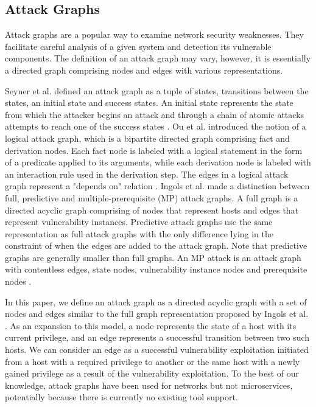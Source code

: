 \subsection{Attack Graphs}
\label{chap:attack_graphs}

Attack graphs \cite{sheyner2002automated} are a popular way to examine network security weaknesses. They facilitate careful analysis of a given system and detection its vulnerable components. The definition of an attack graph may vary, however, it is essentially a directed graph comprising nodes and edges with various representations.

Seyner et al. defined an attack graph as a tuple of states, transitions between the states, an initial state and success states. An initial state represents the state from which the attacker begins an attack and through a chain of atomic attacks attempts to reach one of the success states \cite{sheyner2002automated}. Ou et al. introduced the notion of a logical attack graph, which is a bipartite directed graph comprising fact and derivation nodes. Each fact node is labeled with a logical statement in the form of a predicate applied to its arguments, while each derivation node is labeled with an interaction rule used in the derivation step. The edges in a logical attack graph represent a "depends on" relation \cite{ou2006scalable}. Ingols et al. made a distinction between full, predictive and multiple-prerequisite (MP) attack graphs. A full graph is a directed acyclic graph comprising of nodes that represent hosts and edges that represent vulnerability instances. Predictive attack graphs use the same representation as full attack graphs with the only difference lying in the constraint of when the edges are added to the attack graph. Note that predictive graphs are generally smaller than full graphs. An MP attack is an attack graph with contentless edges, state nodes, vulnerability instance nodes and prerequisite nodes \cite{ingols2006practical}.

In this paper, we define an attack graph as a directed acyclic graph with a set of nodes and edges similar to the full graph representation proposed by Ingols et al. \cite{ingols2006practical}. As an expansion to this model, a node represents the state of a host with its current privilege, and an edge represents a successful transition between two such hosts. We can consider an edge as a successful vulnerability exploitation initiated from a host with a required privilege to another or the same host with a newly gained privilege as a result of the vulnerability exploitation. To the best of our knowledge, attack graphs have been used for networks but not microservices, potentially because there is currently no existing tool support. 